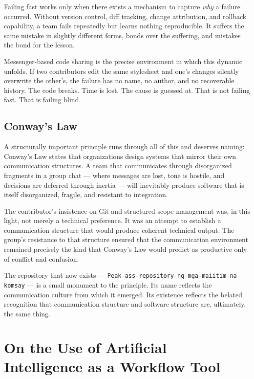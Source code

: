 \documentclass[11pt,a4paper]{book}
\begin{document}
Failing fast works only when there exists a mechanism to capture \emph{why} a failure occurred. Without version control, diff tracking, change attribution, and rollback capability, a team fails repeatedly but learns nothing reproducible. It suffers the same mistake in slightly different forms, bonds over the suffering, and mistakes the bond for the lesson.

Messenger-based code sharing is the precise environment in which this dynamic unfolds. If two contributors edit the same stylesheet and one's changes silently overwrite the other's, the failure has no name, no author, and no recoverable history. The code breaks. Time is lost. The cause is guessed at. That is not failing fast. That is failing blind.

\subsection{Conway's Law}

A structurally important principle runs through all of this and deserves naming: Conway's Law states that organizations design systems that mirror their own communication structures. A team that communicates through disorganized fragments in a group chat --- where messages are lost, tone is hostile, and decisions are deferred through inertia --- will inevitably produce software that is itself disorganized, fragile, and resistant to integration.

The contributor's insistence on Git and structured scope management was, in this light, not merely a technical preference. It was an attempt to establish a communication structure that would produce coherent technical output. The group's resistance to that structure ensured that the communication environment remained precisely the kind that Conway's Law would predict as productive only of conflict and confusion.

The repository that now exists --- \texttt{Peak-ass-repository-ng-mga-maiitim-na-komsay} --- is a small monument to the principle. Its name reflects the communication culture from which it emerged. Its existence reflects the belated recognition that communication structure and software structure are, ultimately, the same thing.

\section{On the Use of Artificial Intelligence as a Workflow Tool}
\end{document}
